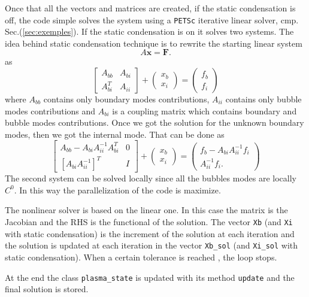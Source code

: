 Once that all the vectors and matrices are created, if the static condensation is off, the code simple solves the system using a \verb|PETSc| iterative linear solver, cmp. Sec.(\ref{sec:exemples}). If the static condensation is on it solves two systems. The idea behind static condensation technique is to rewrite the starting linear system
\begin{equation}
  A\mathbf{x}=\mathbf{F}.
\end{equation}
as
\begin{equation}
  \begin{bmatrix}
    A_{bb} & A_{bi}\\
    A_{bi}^T & A_{ii}
  \end{bmatrix}
  +\begin{pmatrix}
    x_b\\
    x_i
  \end{pmatrix}
  =\begin{pmatrix}
    f_b\\ f_i
  \end{pmatrix}
\end{equation}
where $A_{bb}$ contains only boundary modes contributions, $A_{ii}$ contains only bubble modes contributions and $A_{bi}$ is a coupling matrix which contains boundary and bubble modes contributions. Once we got the solution for the unknown boundary modes, then we got the internal mode. That can be done as
\begin{equation}
  \begin{bmatrix}
    A_{bb}-A_{bi}A_{ii}^{-1}A_{bi}^T & 0\\
    [A_{bi}A_{ii}^{-1}]^T & I
  \end{bmatrix}
  +\begin{pmatrix}
    x_b\\
    x_i
  \end{pmatrix}
  =\begin{pmatrix}
    f_b-A_{bi}A_{ii}^{-1}f_i\\ A_{ii}^{-1}f_i.
  \end{pmatrix}
\end{equation}
The second system can be solved locally since all the bubbles modes are locally $C^0$. In this way the parallelization of the code is maximize.
\medskip

The nonlinear solver is based on the linear one. In this case the matrix is the Jacobian and the RHS is the functional of the solution. The vector \verb|Xb| (and \verb|Xi| with static condensation) is the increment of the solution at each iteration and the solution is updated at each iteration in the vector \verb|Xb_sol| (and \verb|Xi_sol| with static condensation). When a certain tolerance is reached , the loop stops.
\medskip

At the end the class \verb|plasma_state| is updated with its method \verb|update| and the final solution is stored.
